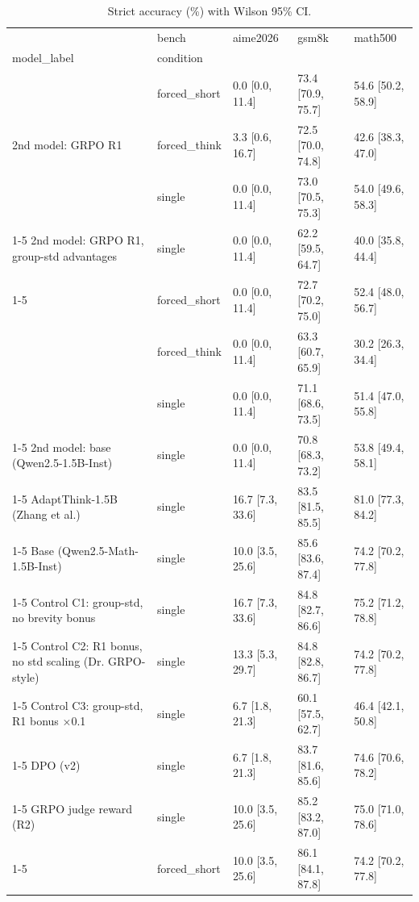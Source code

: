 \begin{table}
\caption{Strict accuracy (\%) with Wilson 95\% CI.}
\label{tab:main}
\begin{tabular}{lllll}
\toprule
 & bench & aime2026 & gsm8k & math500 \\
model_label & condition &  &  &  \\
\midrule
\multirow[t]{3}{*}{2nd model: GRPO R1} & forced_short & 0.0 [0.0, 11.4] & 73.4 [70.9, 75.7] & 54.6 [50.2, 58.9] \\
 & forced_think & 3.3 [0.6, 16.7] & 72.5 [70.0, 74.8] & 42.6 [38.3, 47.0] \\
 & single & 0.0 [0.0, 11.4] & 73.0 [70.5, 75.3] & 54.0 [49.6, 58.3] \\
\cline{1-5}
2nd model: GRPO R1, group-std advantages & single & 0.0 [0.0, 11.4] & 62.2 [59.5, 64.7] & 40.0 [35.8, 44.4] \\
\cline{1-5}
\multirow[t]{3}{*}{2nd model: SFT} & forced_short & 0.0 [0.0, 11.4] & 72.7 [70.2, 75.0] & 52.4 [48.0, 56.7] \\
 & forced_think & 0.0 [0.0, 11.4] & 63.3 [60.7, 65.9] & 30.2 [26.3, 34.4] \\
 & single & 0.0 [0.0, 11.4] & 71.1 [68.6, 73.5] & 51.4 [47.0, 55.8] \\
\cline{1-5}
2nd model: base (Qwen2.5-1.5B-Inst) & single & 0.0 [0.0, 11.4] & 70.8 [68.3, 73.2] & 53.8 [49.4, 58.1] \\
\cline{1-5}
AdaptThink-1.5B (Zhang et al.) & single & 16.7 [7.3, 33.6] & 83.5 [81.5, 85.5] & 81.0 [77.3, 84.2] \\
\cline{1-5}
Base (Qwen2.5-Math-1.5B-Inst) & single & 10.0 [3.5, 25.6] & 85.6 [83.6, 87.4] & 74.2 [70.2, 77.8] \\
\cline{1-5}
Control C1: group-std, no brevity bonus & single & 16.7 [7.3, 33.6] & 84.8 [82.7, 86.6] & 75.2 [71.2, 78.8] \\
\cline{1-5}
Control C2: R1 bonus, no std scaling (Dr. GRPO-style) & single & 13.3 [5.3, 29.7] & 84.8 [82.8, 86.7] & 74.2 [70.2, 77.8] \\
\cline{1-5}
Control C3: group-std, R1 bonus ×0.1 & single & 6.7 [1.8, 21.3] & 60.1 [57.5, 62.7] & 46.4 [42.1, 50.8] \\
\cline{1-5}
DPO (v2) & single & 6.7 [1.8, 21.3] & 83.7 [81.6, 85.6] & 74.6 [70.6, 78.2] \\
\cline{1-5}
GRPO judge reward (R2) & single & 10.0 [3.5, 25.6] & 85.2 [83.2, 87.0] & 75.0 [71.0, 78.6] \\
\cline{1-5}
\multirow[t]{3}{*}{GRPO ours (R1)} & forced_short & 10.0 [3.5, 25.6] & 86.1 [84.1, 87.8] & 74.2 [70.2, 77.8] \\

\end{tabular}
\end{table}

